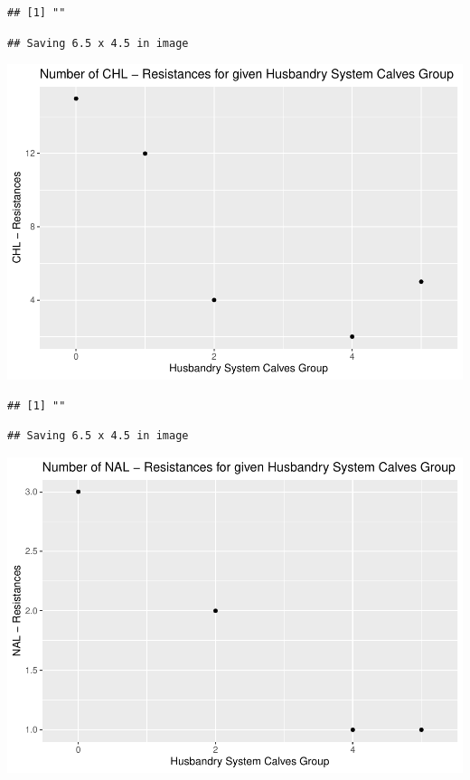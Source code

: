 \documentclass[
]{article}
\begin{document}
\begin{verbatim}
## [1] ""
\end{verbatim}

\begin{verbatim}
## Saving 6.5 x 4.5 in image
\end{verbatim}

\includegraphics{NResistenzen_files/figure-latex/binary_or_nominal_variables-36.pdf}

\begin{verbatim}
## [1] ""
\end{verbatim}

\begin{verbatim}
## Saving 6.5 x 4.5 in image
\end{verbatim}

\includegraphics{NResistenzen_files/figure-latex/binary_or_nominal_variables-37.pdf}
\end{document}
